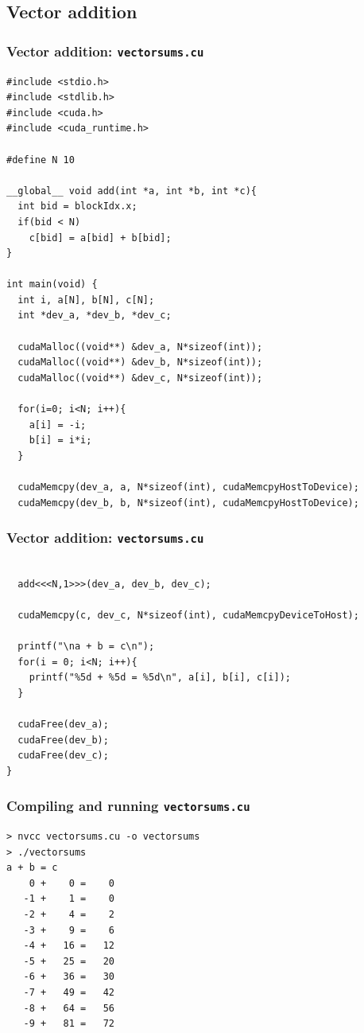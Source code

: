\documentclass[handout]{beamer}
\numberwithin{equation}{section}
\begin{document}
\subsection{Vector addition}

\begin{frame}[fragile]
\frametitle{Vector addition: {\tt vectorsums.cu}} \lstset{basicstyle=\tiny}
\begin{lstlisting}[name=vecadd]
#include <stdio.h>
#include <stdlib.h>
#include <cuda.h>
#include <cuda_runtime.h> 

#define N 10

__global__ void add(int *a, int *b, int *c){
  int bid = blockIdx.x;
  if(bid < N)
    c[bid] = a[bid] + b[bid];
}

int main(void) {
  int i, a[N], b[N], c[N];
  int *dev_a, *dev_b, *dev_c;

  cudaMalloc((void**) &dev_a, N*sizeof(int));
  cudaMalloc((void**) &dev_b, N*sizeof(int));
  cudaMalloc((void**) &dev_c, N*sizeof(int));

  for(i=0; i<N; i++){
    a[i] = -i;
    b[i] = i*i;
  }
  
  cudaMemcpy(dev_a, a, N*sizeof(int), cudaMemcpyHostToDevice);
  cudaMemcpy(dev_b, b, N*sizeof(int), cudaMemcpyHostToDevice);
\end{lstlisting}
\end{frame}


\begin{frame}[fragile]
\frametitle{Vector addition: {\tt vectorsums.cu}} \lstset{basicstyle=\tiny}
\begin{lstlisting}[name=vecadd]

  add<<<N,1>>>(dev_a, dev_b, dev_c);

  cudaMemcpy(c, dev_c, N*sizeof(int), cudaMemcpyDeviceToHost);

  printf("\na + b = c\n");
  for(i = 0; i<N; i++){
    printf("%5d + %5d = %5d\n", a[i], b[i], c[i]);
  }

  cudaFree(dev_a);
  cudaFree(dev_b);
  cudaFree(dev_c);
}
\end{lstlisting}
\end{frame}


\begin{frame}[fragile]
\frametitle{Compiling and running {\tt vectorsums.cu}}
\begin{lstlisting}
> nvcc vectorsums.cu -o vectorsums
> ./vectorsums
a + b = c
    0 +    0 =    0
   -1 +    1 =    0
   -2 +    4 =    2
   -3 +    9 =    6
   -4 +   16 =   12
   -5 +   25 =   20
   -6 +   36 =   30
   -7 +   49 =   42
   -8 +   64 =   56
   -9 +   81 =   72
\end{lstlisting}
\end{frame}
\end{document}
